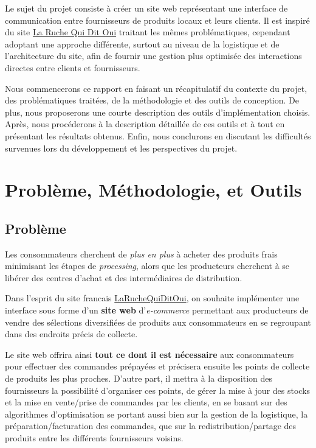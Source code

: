 \documentclass[a4paper,12pt]{report}
\theoremstyle{break}
\theoremstyle{break}
\theoremstyle{break}
\theoremstyle{break}
\theoremstyle{definition}
\theoremstyle{remark}
\begin{document}
Le sujet du projet consiste à créer un site web représentant une interface de communication entre fournisseurs de produits locaux et leurs clients. Il est inspiré du site \og \href{https://laruchequiditoui.fr/fr}{La Ruche Qui Dit Oui} \fg traitant les mêmes problématiques, cependant adoptant une approche différente, surtout au niveau de la logistique et de l'architecture du site, afin de fournir une gestion plus optimisée des interactions directes entre clients et fournisseurs.

Nous commencerons ce rapport en faisant un récapitulatif du contexte du projet, des problématiques traitées, de la méthodologie et des outils de conception. De plus, nous proposerons une courte description des outils d'implémentation choisis. Après, nous procéderons à la description détaillée de ces outils et à tout en présentant les résultats obtenus. Enfin, nous conclurons en discutant les difficultés survenues lors du développement et les perspectives du projet.
\chapter{Problème, Méthodologie, et Outils}
\section{Problème}
Les consommateurs cherchent de \textit{plus en plus} à acheter des produits frais minimisant les étapes de \textit{processing}, alors que les producteurs cherchent à se libérer des centres d’achat et des intermédiaires de distribution.

Dans l’esprit du site francais \href{https://laruchequiditoui.fr/fr}{LaRucheQuiDitOui}, on souhaite implémenter une interface sous forme d'un \textbf{site web} d'\textit{e-commerce} permettant aux producteurs de vendre des sélections diversifiées de produits aux consommateurs en se regroupant dans des endroits précis de collecte.

Le site web offrira ainsi \textbf{tout ce dont il est nécessaire} aux consommateurs pour effectuer des commandes prépayées et précisera ensuite les points de collecte de produits les plus proches. D'autre part, il mettra à la disposition des fournisseurs la possibilité d'organiser ces points, de gérer la mise à jour des stocks et la mise en vente/prise de commandes par les clients, en se basant sur des algorithmes d'optimisation se portant aussi bien sur la gestion de la logistique, la préparation/facturation des commandes, que sur la redistribution/partage des produits entre les différents fournisseurs voisins.
\end{document}
